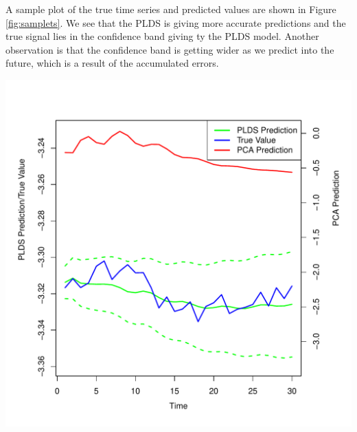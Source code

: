 \documentclass[fleqn]{article}
\let\oldref\ref
\renewcommand{\ref}[1]{(\oldref{#1})}
\begin{document}
A sample plot of the true time series and predicted values are shown in Figure \oldref{fig:samplets}. We see that the PLDS is giving more accurate predictions and the true signal lies in the confidence band giving ty the PLDS model. Another observation is that the confidence band is getting wider as we predict into the future, which is a result of the accumulated errors.

\begin{center}
\includegraphics[scale=0.5]{./figures/hcpSampleTS.pdf}
\label{fig:samplets}
\end{center}

\end{document}
